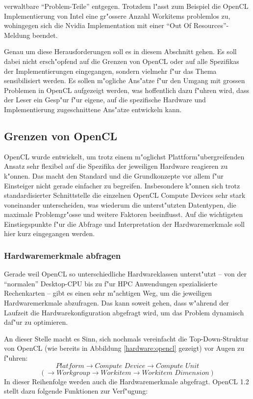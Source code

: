 \begin{refsection}
\noindent verwaltbare ``Problem-Teile'' entgegen. Trotzdem l"asst zum Beispiel
die OpenCL Implementierung von Intel eine gr"ossere Anzahl Workitems problemlos
zu, wohingegen sich die Nvidia Implementation mit einer ``Out Of
Resources''-Meldung beendet.

Genau um diese Herausforderungen soll es in diesem Abschnitt gehen. Es soll dabei nicht
ersch"opfend auf die Grenzen von OpenCL oder auf alle Spezifikas der
Implementierungen eingegangen, sondern vielmehr f"ur das Thema sensibilisiert
werden. Es sollen m"ogliche Ans"atze f"ur den Umgang mit grossen Problemen in
OpenCL aufgezeigt werden, was hoffentlich dazu f"uhren wird, dass der Leser ein
Gesp"ur f"ur eigene, auf die spezifische Hardware und Implementierung
zugeschnittene Ans"atze entwickeln kann.


\subsection{Grenzen von OpenCL}

OpenCL wurde entwickelt, um trotz einem m"oglichst Plattform"ubergreifenden
Ansatz sehr flexibel auf die Spezifika der jeweiligen Hardware reagieren zu
k"onnen. Das macht den Standard und die Grundkonzepte vor allem f"ur Einsteiger
nicht gerade einfacher zu begreifen. Insbesondere k"onnen sich trotz
standardisierter Schnittstelle die einzelnen OpenCL Compute Devices sehr stark
voneinander unterscheiden, was wiederum die unterst"utzten Datentypen, die
maximale Problemgr"osse und weitere Faktoren beeinflusst. Auf die wichtigsten
Einstiegspunkte f"ur die Abfrage und Interpretation der Hardwaremerkmale soll
hier kurz eingegangen werden.


\subsubsection{Hardwaremerkmale abfragen}

Gerade weil OpenCL so unterschiedliche Hardwareklassen unterst"utzt -- von der
``normalen'' Desktop-CPU bis zu f"ur HPC Anwendungen spezialisierte Rechenkarten
-- gibt es einen sehr m"achtigen Weg, um die jeweiligen Hardwaremerkmale
abzufragen.  Das kann soweit gehen, dass w"ahrend der Laufzeit die
Hardwarekonfiguration abgefragt wird, um das Problem dynamisch daf"ur zu
optimieren.

An dieser Stelle macht es Sinn, sich nochmals vereinfacht die Top-Down-Struktur
von OpenCL (wie bereits in Abbildung \ref{hardware:opencl} gezeigt) vor Augen zu
f"uhren:
\[
	\textit{Platform} \rightarrow \textit{Compute Device} \rightarrow \textit{Compute Unit}
\]\[
	(\rightarrow \textit{Workgroup} \rightarrow \textit{Workitem} \rightarrow \textit{Workitem Dimension})
\]
\noindent In dieser Reihenfolge werden auch die Hardwaremerkmale abgefragt.
OpenCL 1.2 stellt dazu folgende Funktionen zur Verf"ugung:


\end{refsection}
